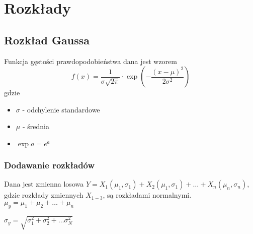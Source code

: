 \section*{Rozkłady}

\subsection*{Rozkład Gaussa}

Funkcja gęstości prawdopodobieństwa dana jest wzorem
\begin{equation*}
    f(x) = \frac{1 }{\sigma \sqrt{2\pi}} \cdot 
    \exp{\left(-\frac{(x-\mu)^2}{2\sigma^2}\right)}
\end{equation*}
gdzie
\begin{itemize}
    \item $\sigma$ - odchylenie standardowe
    \item $\mu$ - średnia
    \item $\exp{a} = e^a$
\end{itemize}

\subsubsection*{Dodawanie rozkładów}

Dana jest zmienna losowa $Y = X_1(\mu_1, \sigma_1) + X_2(\mu_1, \sigma_1) + \hdots + X_n(\mu_n, \sigma_n)$, gdzie rozkłady zmiennych $X_{1-3}$, są rozkładami normalnymi.\\

$\mu_y = \mu_1 + \mu_2 + \hdots + \mu_n$

$\sigma_y = \sqrt{\sigma_1^2 + \sigma_2^2 + \hdots \sigma_N^2}$
